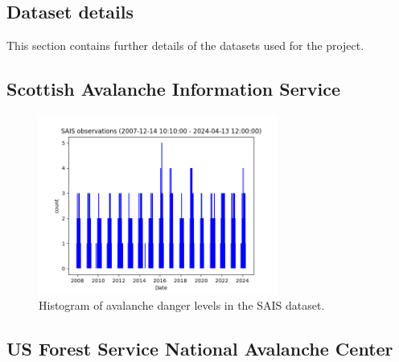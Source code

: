 \documentclass{article}
\newcommand{\sais}{Scottish Avalanche Information Service}
\newcommand{\usfs}{US Forest Service National Avalanche Center}
\begin{document}
\newpage
\begin{appendices}
	\section{Dataset details}
	This section contains further details of the datasets used for the project.
	\subsection{\sais}
	
	\begin{figure}[h]
		\centering
		\includegraphics[width=0.7\textwidth]{sais_observation_histogram.png}
		\caption{Histogram of avalanche danger levels in the SAIS dataset.}
		\label{fig:sais_observation_histogram}
	\end{figure}

	
	
	
	
	
	

	\subsection{\usfs}

	
	\newpage

\end{appendices}
\end{document}
